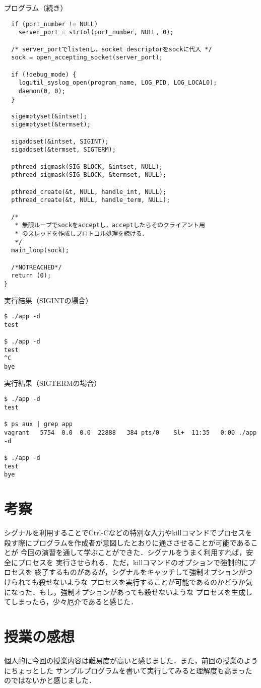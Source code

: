 \documentclass[10pt]{jarticle}
\begin{document}
\begin{itembox}[l]{プログラム（続き）}
  \begin{verbatim}
  if (port_number != NULL)
    server_port = strtol(port_number, NULL, 0);

  /* server_portでlistenし，socket descriptorをsockに代入 */
  sock = open_accepting_socket(server_port);

  if (!debug_mode) {
    logutil_syslog_open(program_name, LOG_PID, LOG_LOCAL0);
    daemon(0, 0);
  }

  sigemptyset(&intset);
  sigemptyset(&termset);

  sigaddset(&intset, SIGINT);
  sigaddset(&termset, SIGTERM);

  pthread_sigmask(SIG_BLOCK, &intset, NULL);
  pthread_sigmask(SIG_BLOCK, &termset, NULL);

  pthread_create(&t, NULL, handle_int, NULL);
  pthread_create(&t, NULL, handle_term, NULL);

  /*
   * 無限ループでsockをacceptし，acceptしたらそのクライアント用
   * のスレッドを作成しプロトコル処理を続ける．
   */
  main_loop(sock);

  /*NOTREACHED*/
  return (0);
}
  \end{verbatim}
\end{itembox}

\begin{itembox}[l]{実行結果（SIGINTの場合）}
  \begin{verbatim}
$ ./app -d
test

$ ./app -d
test
^C
bye
  \end{verbatim}
\end{itembox}

\begin{itembox}[l]{実行結果（SIGTERMの場合）}
  \begin{verbatim}
$ ./app -d
test

$ ps aux | grep app
vagrant   5754  0.0  0.0  22888   384 pts/0    Sl+  11:35   0:00 ./app -d

$ ./app -d
test
bye
  \end{verbatim}
\end{itembox}

\section{考察}
シグナルを利用することでCtrl-Cなどの特別な入力やkillコマンドでプロセスを
殺す際にプログラムを作成者が意図したとおりに通ささせることが可能であることが
今回の演習を通して学ぶことができた．シグナルをうまく利用すれば，安全にプロセスを
実行させられる．ただ，killコマンドのオプションで強制的にプロセスを
終了するものがあるが，シグナルをキャッチして強制オプションがつけられても殺せないような
プロセスを実行することが可能であるのかどうか気になった．もし，強制オプションがあっても殺せないような
プロセスを生成してしまったら，少々厄介であると感じた．

\section{授業の感想}
個人的に今回の授業内容は難易度が高いと感じました．また，前回の授業のようにちょっとした
サンプルプログラムを書いて実行してみると理解度も高まったのではないかと感じました．
\end{document}
